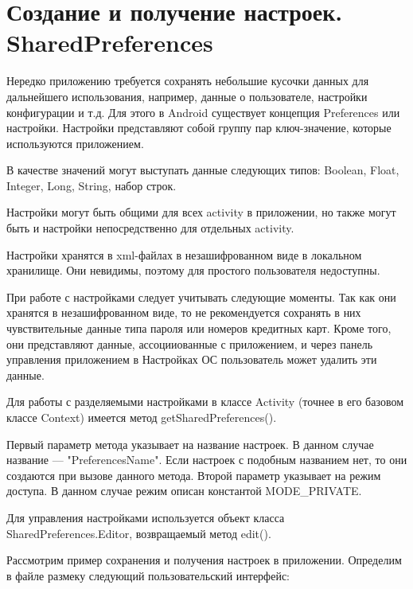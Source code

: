 \section{Создание и получение настроек. SharedPreferences}
Нередко приложению требуется сохранять небольшие кусочки данных для
дальнейшего использования, например, данные о пользователе, настройки
конфигурации и т.д. Для этого в Android существует концепция Preferences
или настройки. Настройки представляют собой группу пар ключ-значение,
которые используются приложением.\par
В качестве значений могут выступать данные следующих типов: Boolean,
Float, Integer, Long, String, набор строк.\par
Настройки могут быть общими для всех activity в приложении, но также
могут быть и настройки непосредственно для отдельных activity.\par
Настройки хранятся в xml-файлах в незашифрованном виде в локальном
хранилище. Они невидимы, поэтому для простого пользователя недоступны.\par
При работе с настройками следует учитывать следующие моменты. Так как
они хранятся в незашифрованном виде, то не рекомендуется сохранять в них
чувствительные данные типа пароля или номеров кредитных карт. Кроме
того, они представляют данные, ассоцииованные с приложением, и через
панель управления приложением в Настройках ОС пользователь может
удалить эти данные.\par
Для работы с разделяемыми настройками в классе Activity (точнее в его
базовом классе Context) имеется метод getSharedPreferences().\par
Первый параметр метода указывает на название настроек. В данном случае
название --- "PreferencesName". Если настроек с подобным названием нет, то
они создаются при вызове данного метода. Второй параметр указывает на
режим доступа. В данном случае режим описан константой MODE\_PRIVATE.\par
Для управления настройками используется объект класса
SharedPreferences.Editor, возвращаемый метод edit().\par
Рассмотрим пример сохранения и получения настроек в приложении.
Определим в файле размеку следующий пользовательский
интерфейс:

